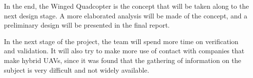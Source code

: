 In the end, the Winged Quadcopter is the concept that will be taken along to the next design stage. A more elaborated analysis will be made of the concept, and a preliminary design will be presented in the final report.



In the next stage of the project, the team will spend more time on verification and validation. It will also try to make more use of contact with companies that make hybrid UAVs, since it was found that the gathering of information on the subject is very difficult and not widely available.











